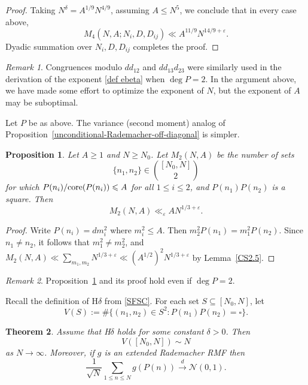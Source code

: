 \documentclass[reqno, 12pt]{amsart}
\theoremstyle{plain}
\newtheorem{theorem}{Theorem}[section]
\newtheorem{proposition}[theorem]{Proposition}
\theoremstyle{definition}
\theoremstyle{remark}
\newtheorem*{remark}{Remark}
\renewcommand{\le}{\leqslant}
\renewcommand{\ge}{\geqslant}
\newcommand{\co}{\textnormal{core}}
\begin{document}
\begin{proof}
Taking $N^\delta = A^{1/9} N^{4/9}$, assuming $A\le N^5$,
we conclude that in every case above,
$$M_4(N,A;N_i,D,D_{ij}) \ll A^{11/9} N^{14/9+\varepsilon}.$$
Dyadic summation over $N_i,D,D_{ij}$ completes the proof.
\end{proof}

\begin{remark}Congruences modulo $dd_{12}$ and $dd_{13}d_{23}$
were similarly used in the derivation of the exponent \eqref{def ebeta} when $\deg{P}=2$.
In the argument above, we have made some effort to optimize the exponent of $N$,
but the exponent of $A$ may be suboptimal.
\end{remark}

Let $P$ be as above.
The variance (second moment)
analog of Proposition~\ref{unconditional-Rademacher-off-diagonal} is simpler.

\begin{proposition}
\label{easy-variance}
Let $A\ge 1$ and $N\ge N_0$.
Let $M_2(N,A)$ be the number of sets
$$\{n_1,n_2\}\in \binom{[N_0,N]}{2}$$
for which $P(n_i)/\co(P(n_i)) \le A$ for all $1\le i\le 2$,
and $P(n_1)P(n_2)$ is a square.
Then
$$M_2(N,A)\ll_\varepsilon A N^{1/3+\varepsilon}.$$
\end{proposition}

\begin{proof}
Write $P(n_i) = dm_i^2$ where $m_i^2\le A$.
Then $m_2^2 P(n_1) = m_1^2 P(n_2)$.
Since $n_1\ne n_2$, it follows that $m_1^2\ne m_2^2$,
and $M_2(N,A) \ll \sum_{m_1,m_2} N^{1/3+\varepsilon}
\ll (A^{1/2})^2 N^{1/3+\varepsilon}$
by Lemma~\ref{CS2.5}.
\end{proof}

\begin{remark}
Proposition~\ref{easy-variance} and its proof
hold even if $\deg P = 2$.
\end{remark}

Recall the definition of H$\delta$ from \eqref{SFSC}.
For each set $S\subseteq [N_0,N]$, let
\begin{equation}
\label{define-V(S)}
V(S) := \#\{(n_1,n_2)\in S^2: P(n_1)P(n_2) = \square\}.
\end{equation}

\begin{theorem}
\label{THM:conditional-CLT}
Assume that H$\delta$ holds for some constant $\delta>0$.
Then
\begin{equation}
\label{conditional-variance}
V([N_0,N]) \sim N
\end{equation}
as $N\to \infty$.
Moreover, if $g$ is an extended Rademacher RMF then
\begin{equation}
\label{EQN:conditional-CLT-2}
\frac{1}{\sqrt{N}} \sum_{1\le n\le N} g(P(n))
\xrightarrow[]{d} \mathcal{N}(0,1).
\end{equation}
\end{theorem}
\end{document}
